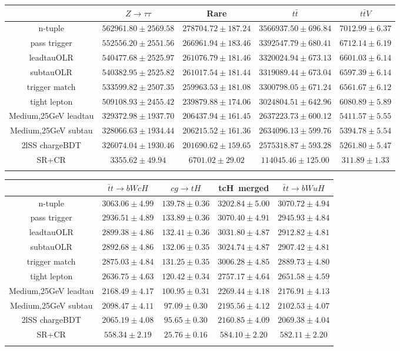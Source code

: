 \begin{tabular}{ccccc} \toprule\toprule
 & $Z\to \tau\tau$ & Rare & $t\bar{t}$ & $t\bar{t}V$\\\midrule
n-tuple & $562961.80\pm2569.58$ & $278704.72\pm187.24$ & $3566937.50\pm696.84$ & $7012.99\pm6.37$\\
pass trigger & $552556.20\pm2551.56$ & $266961.94\pm183.46$ & $3392547.79\pm680.41$ & $6712.14\pm6.19$\\
leadtauOLR & $540477.68\pm2525.97$ & $261076.79\pm181.46$ & $3320024.94\pm673.13$ & $6601.03\pm6.14$\\
subtauOLR & $540382.95\pm2525.82$ & $261017.54\pm181.44$ & $3319089.44\pm673.04$ & $6597.39\pm6.14$\\
trigger match & $533599.82\pm2507.35$ & $259963.53\pm181.08$ & $3300798.05\pm671.24$ & $6561.67\pm6.12$\\
tight lepton & $509108.93\pm2455.42$ & $239879.88\pm174.06$ & $3024804.51\pm642.96$ & $6080.89\pm5.89$\\
Medium,25GeV leadtau & $329372.98\pm1937.70$ & $206437.94\pm161.45$ & $2637223.73\pm600.12$ & $5411.57\pm5.55$\\
Medium,25GeV subtau & $328066.63\pm1934.44$ & $206215.52\pm161.36$ & $2634096.13\pm599.76$ & $5394.78\pm5.54$\\
2lSS chargeBDT & $326074.04\pm1930.46$ & $201690.62\pm159.65$ & $2575318.87\pm593.28$ & $5261.80\pm5.47$\\
SR+CR & $3355.62\pm49.94$ & $6701.02\pm29.02$ & $114045.46\pm125.00$ & $311.89\pm1.33$\\
\bottomrule\bottomrule\\
\end{tabular}
\begin{tabular}{ccccc} \toprule\toprule
 & $\bar{t}t\to bWcH$ & $cg\to tH$ & tcH~merged & $\bar{t}t\to bWuH$\\\midrule
n-tuple & $3063.06\pm4.99$ & $139.78\pm0.36$ & $3202.84\pm5.00$ & $3070.72\pm4.94$\\
pass trigger & $2936.51\pm4.89$ & $133.89\pm0.36$ & $3070.40\pm4.91$ & $2945.93\pm4.84$\\
leadtauOLR & $2899.38\pm4.86$ & $132.41\pm0.36$ & $3031.80\pm4.87$ & $2912.82\pm4.81$\\
subtauOLR & $2892.68\pm4.86$ & $132.06\pm0.35$ & $3024.74\pm4.87$ & $2907.42\pm4.81$\\
trigger match & $2875.03\pm4.84$ & $131.25\pm0.35$ & $3006.28\pm4.85$ & $2889.73\pm4.80$\\
tight lepton & $2636.75\pm4.63$ & $120.42\pm0.34$ & $2757.17\pm4.64$ & $2651.58\pm4.59$\\
Medium,25GeV leadtau & $2168.49\pm4.17$ & $100.95\pm0.31$ & $2269.44\pm4.18$ & $2176.91\pm4.13$\\
Medium,25GeV subtau & $2098.47\pm4.11$ & $97.09\pm0.30$ & $2195.56\pm4.12$ & $2102.53\pm4.07$\\
2lSS chargeBDT & $2065.19\pm4.08$ & $95.65\pm0.30$ & $2160.85\pm4.09$ & $2069.38\pm4.04$\\
SR+CR & $558.34\pm2.19$ & $25.76\pm0.16$ & $584.10\pm2.20$ & $582.11\pm2.20$\\
\bottomrule\bottomrule\\
\end{tabular}
